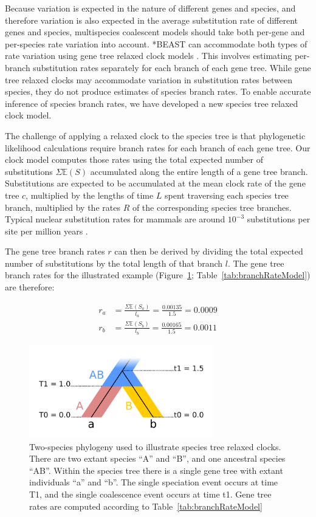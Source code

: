 \documentclass[12pt]{article}
\begin{document}
Because variation is expected in the nature of different genes and species, and
therefore variation is also expected in the average substitution rate of different
genes and species, multispecies coalescent models should take both per-gene and
per-species rate variation into account. *BEAST can accommodate both types of
rate variation using gene tree relaxed clock models \citep[for examples see][]{Berv2014120, Lambert2015146}.
This involves estimating per-branch substitution rates separately
for each branch of each gene tree. While gene tree relaxed clocks may
accommodate variation in substitution rates between species, they do not produce
estimates of species branch rates. To enable accurate inference of species
branch rates, we have developed a new species tree relaxed clock model.

The challenge of applying a relaxed clock to the species tree is that
phylogenetic likelihood calculations require branch rates for each branch of
each gene tree. Our clock model computes those rates using the total expected
number of substitutions $\Sigma \mathbb{E}(S)$ accumulated along the entire
length of a gene tree branch. Substitutions are expected to be accumulated at
the mean clock rate of the gene tree $c$, multiplied by the lengths of time
$L$ spent traversing each species tree branch, multiplied by the rates $R$ of
the corresponding species tree branches.
Typical nuclear substitution rates for mammals are around $10^{-3}$ substitutions per
site per million years \citep{Phillips06102009}.

The gene tree branch rates $r$ can then be derived by dividing the total
expected number of substitutions by the total length of that branch $l$. The
gene tree branch rates for the illustrated example
(Figure~\ref{fig:branchRateModel}; Table~\ref{tab:branchRateModel}) are
therefore:

\begin{align}
r_a &= \frac{\Sigma \mathbb{E}(S_a)}{l_a} = \frac{0.00135}{1.5} = 0.0009\\
r_b &= \frac{\Sigma \mathbb{E}(S_b)}{l_b} = \frac{0.00165}{1.5} = 0.0011
\end{align}

\begin{figure}[htb!]
\centering
\includegraphics[width=80mm]{relaxed_clock.png}
\caption
{Two-species phylogeny used to illustrate species tree relaxed
clocks. There are two extant species ``A'' and ``B'', and one ancestral species ``AB''.
Within the species tree there is a single gene tree with extant individuals ``a''
and ``b''. The single speciation event occurs at time T1, and the single coalescence
event occurs at time t1. Gene tree rates are computed according to Table~\ref{tab:branchRateModel}}
\label{fig:branchRateModel}
\end{figure}
\end{document}
